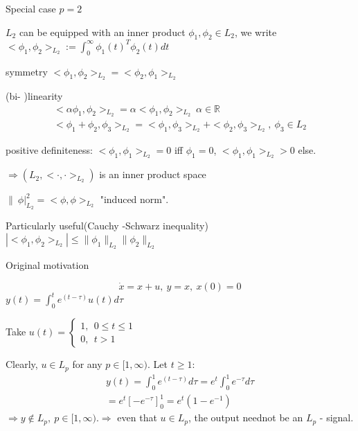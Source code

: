 Special case $p = 2$ 

$L_2$ can be equipped with an inner product $\phi_1, \phi_2 \in L_2$, we write $<\phi_1, \phi_2>_{L_2} :=  \int_0^{\infty} \phi_1(t)^T\phi_2(t)dt$

symmetry $<\phi_1, \phi_2>_{L_2} = <\phi_2, \phi_1>_{L_2}$

(bi- )linearity 
\begin{equation*}
\begin{split}
<\alpha \phi_1, \phi_2>_{L_2} = \alpha <\phi_1, \phi_2>_{L_2} \ \alpha \in \mathbb{R} \\ 
<\phi_1 + \phi_2, \phi_3>_{L_2} = <\phi_1, \phi_3>_{L_2} + <\phi_2, \phi_3>_{L_2}, \ \phi_3 \in L_2 
\end{split}
\end{equation*}

positive definiteness: $<\phi_1, \phi_1>_{L_2} = 0$ iff $\phi_1 = 0$, $<\phi_1, \phi_1>_{L_2} > 0$ else.

$\Rightarrow (L_2, <\cdot, \cdot>_{L_2})$ is an inner product space

$\|\ \phi|_{L_2}^2 = < \phi, \phi>_{L_2}$ "induced norm". 

Particularly useful(Cauchy -Schwarz inequality) $|<\phi_1,\phi_2>_{L_2}| \leq \|\phi_1\|_{L_2}\|\phi_2\|_{L_2}$

Original motivation 


\begin{Example}
\begin{equation*}
\dot{x} = x+u, \ y = x, \ x(0) = 0
\end{equation*}
$y(t) = \int_0^te^{(t-\tau)}u(t)d\tau$

Take $u(t) = \left\{
                \begin{array}{ll}
                  1, \ \ 0 \leq t \leq 1\\
                  0, \ \ t > 1
                \end{array}
              \right. $
              
Clearly, $u \in L_p$ for any $p \in [1,\infty)$. Let $t \geq 1$: 
\begin{equation*}
\begin{split}
y(t) = \int_0^1 e^{(t-\tau)}d\tau = e^t\int_0^1e^{-\tau}d\tau \\
= e^t[-e^{-\tau}]^1_0 = e^t(1-e^{-1})
\end{split}
\end{equation*}
$\Rightarrow y \not\in L_p, \ p \in [1,\infty) $.$\Rightarrow $ even that $ u \in L_p$, the output neednot be an $L_p$ - signal.
\end{Example}

